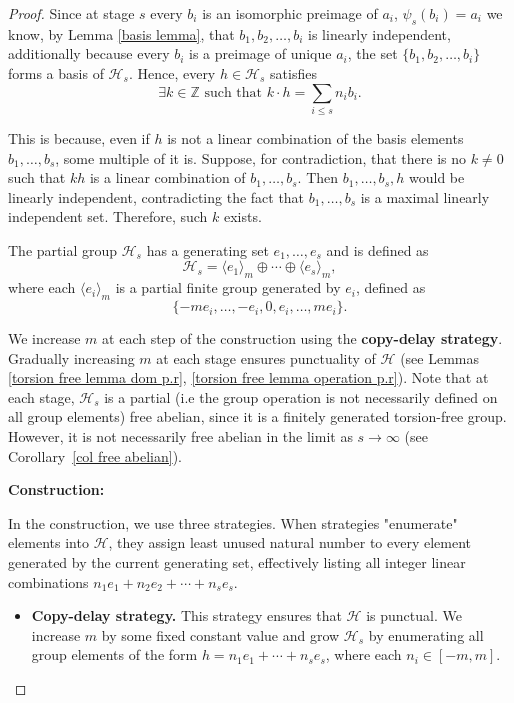 \documentclass{pracalicmgr2025}
\theoremstyle{plain}            %
\theoremstyle{remark}           %
\theoremstyle{definition}       %
\begin{document}
\begin{proof}
Since at stage $s$ every $b_i$ is an isomorphic preimage of $a_i$, $\psi_s(b_i) = a_i$ we know, by Lemma \ref{basis lemma}, that $b_1,b_2,\dots,b_i$ is linearly independent, additionally because every $b_i$ is a preimage of unique $a_i$, the set $\{b_1, b_2,\dots,b_i\}$ forms a basis of $\mathcal{H}_s$. Hence, every $h\in \mathcal{H}_s$ satisfies
$$
\exists k \in \mathbb{Z} \text{ such that } k \cdot h = \sum_{i \leq s} n_i b_i.
$$

This is because, even if $h$ is not a linear combination of the basis elements $b_1, \dots, b_s$, some multiple of it is. Suppose, for contradiction, that there is no $k \ne 0$ such that $k h$ is a linear combination of $b_1,\dots,b_s$. Then $b_1,\dots,b_s,h$ would be linearly independent, contradicting the fact that $b_1,\dots,b_s$ is a maximal linearly independent set. Therefore, such $k$ exists.

The partial group $\mathcal{H}_s$ has a generating set $e_1,\dots,e_s$ and is defined as
$$
\mathcal{H}_s = \langle e_1 \rangle_m \oplus \cdots \oplus \langle e_s \rangle_m,
$$
where each $\langle e_i \rangle_m$ is a partial finite group generated by $e_i$, defined as
$$
\{-m e_i, \dots, -e_i, 0, e_i, \dots, m e_i\}.
$$

We increase $m$ at each step of the construction using the \textbf{copy-delay strategy}. Gradually increasing $m$ at each stage ensures punctuality of $\mathcal{H}$ (see Lemmas \ref{torsion free lemma dom p.r}, \ref{torsion free lemma operation p.r}). Note that at each stage, $\mathcal{H}_s$ is a partial (i.e the group operation is not necessarily defined on all group elements) free abelian, since it is a finitely generated torsion-free group. However, it is not necessarily free abelian in the limit as $s \to \infty$ (see Corollary~\ref{col free abelian}).

\textbf{Construction:}

In the construction, we use three strategies. When strategies "enumerate" elements into $\mathcal{H}$, they assign least unused natural number to every element generated by the current generating set, effectively listing all integer linear combinations $n_1 e_1 + n_2 e_2 + \cdots + n_{s} e_{s}$.
\begin{itemize}
    \item \textbf{Copy-delay strategy.} This strategy ensures that $\mathcal{H}$ is punctual. We increase $m$ by some fixed constant value and grow $\mathcal{H}_s$ by enumerating all group elements of the form $h = n_1 e_1 + \cdots + n_s e_s$, where each $n_i \in [-m, m]$.


\end{itemize}
\end{proof}
\end{document}
